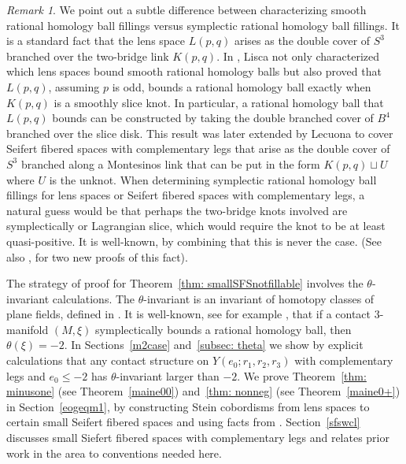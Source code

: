 \documentclass[11pt]{amsart}
\theoremstyle{plain}
\theoremstyle{definition}
\theoremstyle{remark}
\newtheorem{remark}[theorem]{Remark}
\numberwithin{theorem}{section}
\begin{document}
\begin{remark}
We point out a subtle difference between characterizing smooth rational homology ball fillings versus symplectic rational homology ball fillings. It is a standard fact that the lens space $L(p,q)$ arises as the double cover of $S^3$ branched over the two-bridge link $K(p,q)$. In \cite[Corollary~$1.3$]{Lisca2007}, Lisca not only characterized which lens spaces bound smooth rational homology balls but also proved that $L(p,q)$, assuming $p$ is odd, bounds a rational homology ball exactly when $K(p,q)$ is a smoothly slice knot. In particular, a rational homology ball that $L(p,q)$ bounds can be constructed by taking the double branched cover of $B^4$ branched over the slice disk. This result was later extended by Lecuona \cite{Lecuona2019} to cover Seifert fibered spaces with complementary legs that arise as the double cover of $S^3$ branched along a Montesinos link that can be put in the form $K(p,q)\sqcup U$ where $U$ is the unknot. When determining symplectic rational homology ball fillings for lens spaces or Seifert fibered spaces with complementary legs, a natural guess would be that perhaps the two-bridge knots involved are symplectically or Lagrangian slice, which would require the knot to be at least quasi-positive.  It is well-known, by combining \cite{BoileauRudolph1995, KronheimerMrowka93, Rudolph93} that this is never the case. (See also \cite{Ozbagci-bridge}, for two new proofs of this fact). 
\end{remark}


The strategy of proof for Theorem~\ref{thm: smallSFSnotfillable} involves the $\theta$-invariant calculations. The $\theta$-invariant is an invariant of homotopy classes of plane fields, defined in \cite{Gompf98}. It is well-known, see for example \cite{EtnyreOzbagciTosun2025}, that if a contact $3$-manifold $(M,\xi)$ symplectically bounds a rational homology ball, then $\theta(\xi)=-2$. In Sections~\ref{m2case} and~\ref{subsec: theta} we show by explicit calculations that any contact structure on $Y(e_0;r_1,r_2,r_3)$ with complementary legs and $e_0\leq -2$ has $\theta$-invariant larger than $-2$. We prove Theorem~\ref{thm: minusone} (see Theorem~\ref{maine00}) and~\ref{thm: nonneg} (see Theorem~\ref{maine0+}) in Section~\ref{eogeqm1}, by constructing Stein cobordisms from lens spaces to certain small Seifert fibered spaces and using facts from \cite{EtnyreOzbagciTosun2025}. Section~\ref{sfswcl} discusses small Siefert fibered spaces with complementary legs and relates prior work in the area to conventions needed here. 
\end{document}
